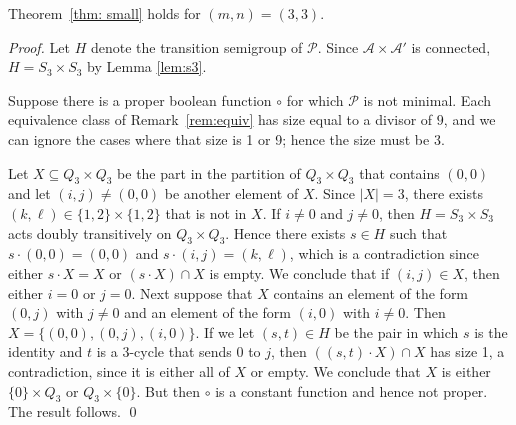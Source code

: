 \documentclass{llncs}
\newcommand{\cA}{{\mathcal A}}
\newcommand{\cP}{{\mathcal P}}
\begin{document}
\begin{proposition}
Theorem~\ref{thm: small} holds for $(m,n)=(3,3)$.
\end{proposition}
\begin{proof}
Let $H$ denote the transition semigroup of $\cP$.  Since $\cA\times \cA'$ is connected,  $H=S_3\times S_3$ by Lemma \ref{lem:s3}.

Suppose  there is a proper boolean function $\circ$ for which $\cP$ is not minimal.  
Each equivalence class of Remark~\ref{rem:equiv} has size equal to a divisor of $9$, and we can ignore the cases where that size is 1 or 9; hence the size must be 3. 

Let $X\subseteq Q_3\times Q_3$ be the part in the partition of $Q_3\times Q_3$ that contains $(0,0)$ and let $(i,j)\neq (0,0)$ be another element of $X$.  
Since $|X|=3$, there exists $(k,\ell)\in \{1,2\}\times \{1,2\}$ that is not in $X$.  
If $i\neq 0$ and $j\neq 0$, then $H=S_3\times S_3$ acts doubly transitively on $Q_3\times Q_3$. 
Hence there exists $s\in H$ such that $s\cdot (0,0)=(0,0)$ and $s\cdot (i,j)=(k,\ell)$, which is a contradiction since either $s\cdot X = X$ or $(s\cdot X)\cap X$ is empty.   
We conclude that if $(i,j)\in X$, then either $i=0$ or $j=0$.  
Next suppose that $X$ contains an element of the form $(0,j)$ with $j\neq 0$  and an element of the form $(i,0)$ with $i\neq 0$.  
Then
$X=\{(0,0),(0,j),(i,0)\}$.  
If we let $(s,t)\in H$ be the pair in which $s$ is the identity and $t$ is a 3-cycle that sends $0$ to $j$, then  $((s,t)\cdot X)\cap X$ has size 1, a contradiction, since it is either all of $X$ or empty.  We conclude that $X$ is either $\{0\}\times Q_3$ or $Q_3\times \{0\}$.  But then $\circ$ is a constant function and hence not proper.   The result follows.
\qed
\end{proof}
\end{document}
